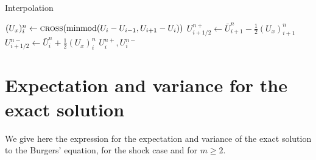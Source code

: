\documentclass{article}
\newcommand{\minmod}{ \text{minmod} }
\begin{document}
\begin{algorithm}
    \caption{Interpolation} \label{algo:interpolate} 
\begin{algorithmic}
	\State $(U_x)_i^n  \gets \Call{cross}{\minmod (U_i - U_{i-1} , U_{i+1} - U_i)}$
    \State $U^{n +}_{i+1/2} \gets \bar U_{i+1}^n - \frac{1}{2} (U_x)_{i+1}^n$  
    \State $U^{n -}_{i+1/2} \gets \bar U_i^n + \frac{1}{2} (U_x)_i^n$  
	\EndFor
\State \Return $U^{n +}_i, U^{n -}_i$
\end{algorithmic}
\end{algorithm}


\section{Expectation and variance for the exact solution} \label{sec:Exact}
We give here the expression for the expectation and variance of the exact solution to the Burgers' equation, for the shock case and for $m \geq 2$.  
\end{document}
